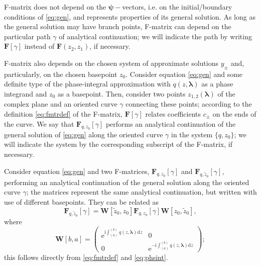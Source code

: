 \documentclass[atmp]{ipart_v1}
\def\rmd{\mathrm{d}}
\def\rme{\mathrm{e}}
\def\rmi{\mathrm{i}}
\def\lmbd{\bm{\lambda}}
\def\psii{\bm\psi}
\def\F{\bm{F}}
\def\W{\bm{W}}
\newcommand\eref[1]{\eqref{#1}}
\newcommand\phsintgrnd[1][z]{q(#1,\lmbd)}
\newcommand\phsintgrl[3][z]{\int_{#2}^{#3} \phsintgrnd[#1] \rmd #1}
\begin{document}
F-matrix does not depend on the $\psii-$vectors, i.e. on the initial/boundary conditions 
of \eref{eq:gen}, and represents properties of its general solution. 
As long as the general solution may have branch points, 
F-matrix can depend on the particular path $\gamma$ of analytical continuation; 
we will indicate the path by writing $\F[\gamma]$ instead of $\F(z_2,z_1)$, if necessary.
 
F-matrix also depends on the chosen system of approximate solutions $y_\pm$ and, 
particularly, on the chosen basepoint $z_0$. Consider equation \eref{eq:gen} and some definite
type of the phase-integral approximation with $q(z,\lmbd)$ as a phase integrand 
and $z_0$ as a basepoint. Then, consider two points $z_{1,2}(\lmbd)$ of the complex plane 
and an oriented curve $\gamma$ connecting these points; 
according to the definition \eref{eq:fmtrdef} of the F-matrix, 
$\F[\gamma]$ relates coefficients $c_\pm$ on the ends of the curve. We say 
that $\F_{q,z_0}[\gamma]$ performs an analytical continuation of the general solution of \eref{eq:gen} 
along the oriented curve $\gamma$ in the system $\{q,z_0\}$; we will indicate the
system by the corresponding subscript of the F-matrix, if necessary.

Consider equation \eref{eq:gen} and two F-matrices, $\F_{q,z_0}[\gamma]$ and $\F_{q,\tilde{z}_0}[\gamma]$, 
performing an analytical continuation of the general solution along the oriented curve $\gamma$; the matrices
represent the same analytical continuation, but written with use of different basepoints. They can be related as
\begin{equation}
\F_{q,\tilde{z}_0}[\gamma] = \W[\tilde{z}_0,z_0]\F_{q,z_0}[\gamma]\W[z_0,\tilde{z}_0],
\label{eq:bpchange} 
\end{equation}
where
\begin{equation}
\W[b,a] =  
\left(\begin{array}{*{2}{c}}
\rme^{\rmi \phsintgrl{(a)}{(b)}} & 0 \\ 0 & \rme^{-\rmi \phsintgrl{(a)}{(b)}} 
\end{array}\right);
\label{eq:W}
\end{equation}
this follows directly from \eref{eq:fmtrdef} and \eref{eq:phsint}. 
\end{document}
